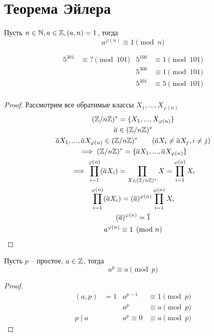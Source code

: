 \documentclass[main]{subfiles}
\begin{document}
\chapter{Теорема Эйлера}
\begin{theorem}
    Пусть $n \in \mathbb{N}, a \in \mathbb{Z}, (a,n) = 1$, тогда
    \[a^{\varphi(n)} \equiv 1 \pmod{n}\]
\end{theorem}
\begin{example}
    \begin{align*}
        5^{301} & \equiv ? \pmod{101} & 5^{100} & \equiv 1 \pmod{101} \\
                &                     & 5^{300} & \equiv 1 \pmod{101} \\
                &                     & 5^{301} & \equiv 5 \pmod{101} \\
    \end{align*}
\end{example}
\begin{proof}
    Рассмотрим все обратимые классы $X_1,..., X_{\varphi(n)}$
    \begin{gather*}
        (\mathbb{Z}/n\mathbb{Z})^* = \{X_1,..., X_{\varphi(n)}\}\\
        \overline{a} \in (\mathbb{Z}/n\mathbb{Z})^*\\
        \overline{a} X_1, ..., \overline{a} X_{\varphi(n)} \in (\mathbb{Z}/n\mathbb{Z})^*
        \qquad (\overline{a}X_i \neq \overline{a}X_j, i \neq j)\\
        \implies (\mathbb{Z}/n\mathbb{Z})^* = \{\overline{a} X_1, ..., \overline{a}X_{\varphi(n)}\}\\
        \implies \prod_{i=1}^{\varphi(n)} (\overline{a}X_i)
        = \prod_{X \in (\mathbb{Z}/n\mathbb{Z})^*} X = \prod_{i=1}^{\varphi(a)} X_i \\
        \prod_{i=1}^{\varphi(n)} (\overline{a}X_i) = (\overline{a})^{\varphi(n)} \prod_{i=1}^{\varphi(n)} X_i\\
        (\overline{a})^{\varphi(n)} = \overline{1}\\
        a^{\varphi(n)} \equiv 1 \pmod{n}
    \end{gather*}
\end{proof}

\begin{corollary}
    Пусть $p$ -- простое, $a\in \mathbb{Z}$, тогда
    \[a^p \equiv a \pmod{p}\]
\end{corollary}
\begin{proof}
    \begin{align*}
        (a,p)    & =1 & a^{p-1}      & \equiv 1 \pmod{p} \\
                 &    & a^p          & \equiv a \pmod{p} \\
        p \mid a &    & a^p \equiv 0 & \equiv a \pmod{p}
    \end{align*}
\end{proof}
\end{document}
